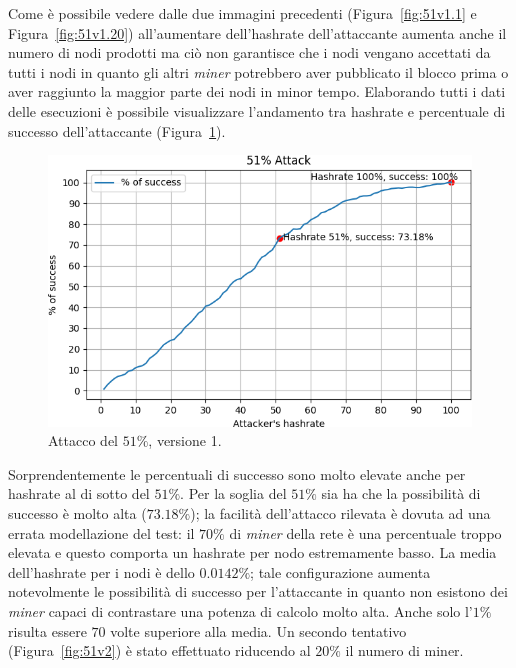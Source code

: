 Come è possibile vedere dalle due immagini precedenti (Figura~\ref{fig:51v1.1} e Figura~\ref{fig:51v1.20}) all'aumentare dell'hashrate dell'attaccante aumenta anche il numero di nodi prodotti ma ciò non garantisce che i nodi vengano accettati da tutti i nodi in quanto gli altri \textit{miner} potrebbero aver pubblicato il blocco prima o aver raggiunto la maggior parte dei nodi in minor tempo.\newline
Elaborando tutti i dati delle esecuzioni è possibile visualizzare l'andamento tra hashrate e percentuale di successo dell'attaccante (Figura~\ref{fig:51v1}).
\begin{figure}[H]
    \centering
    \includegraphics[width=\textwidth]{./images/51-v1.png}
    \caption{Attacco del $51\%$, versione 1.}
    \label{fig:51v1}
\end{figure}
Sorprendentemente le percentuali di successo sono molto elevate anche per hashrate al di sotto del $51\%$. Per la soglia del $51\%$ sia ha che la possibilità di successo è molto alta ($73.18\%$); la facilità dell'attacco rilevata è dovuta ad una errata modellazione del test: il $70\%$ di \textit{miner} della rete è una percentuale troppo elevata e questo comporta un hashrate per nodo estremamente basso. La media dell'hashrate per i nodi è dello $0.0142\%$; tale configurazione aumenta notevolmente le possibilità di successo per l'attaccante in quanto non esistono dei \textit{miner} capaci di contrastare una potenza di calcolo molto alta. Anche solo l'$1\%$ risulta essere $70$ volte superiore alla media.\newline
Un secondo tentativo (Figura~\ref{fig:51v2}) è stato effettuato riducendo al $20\%$ il numero di miner.
